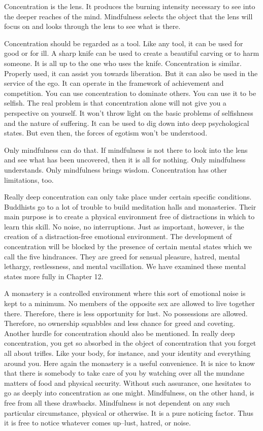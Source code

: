 Concentration is the lens. It produces the burning intensity necessary to see
into the deeper reaches of the mind. Mindfulness selects the object that the
lens will focus on and looks through the lens to see what is there.

Concentration should be regarded as a tool. Like any tool, it can be used for
good or for ill. A sharp knife can be used to create a beautiful carving or to
harm someone. It is all up to the one who uses the knife. Concentration is
similar. Properly used, it can assist you towards liberation. But it can also be
used in the service of the ego. It can operate in the framework of achievement
and competition. You can use concentration to dominate others. You can use it to
be selfish. The real problem is that concentration alone will not give you a
perspective on yourself. It won't throw light on the basic problems of
selfishness and the nature of suffering. It can be used to dig down into deep
psychological states. But even then, the forces of egotism won't be understood.

Only mindfulness can do that. If mindfulness is not there to look into the lens
and see what has been uncovered, then it is all for nothing. Only mindfulness
understands. Only mindfulness brings wisdom. Concentration has other
limitations, too.

Really deep concentration can only take place under certain specific conditions.
Buddhists go to a lot of trouble to build meditation halls and monasteries.
Their main purpose is to create a physical environment free of distractions in
which to learn this skill. No noise, no interruptions. Just as important,
however, is the creation of a distraction-free emotional environment. The
development of concentration will be blocked by the presence of certain mental
states which we call the five hindrances. They are greed for sensual pleasure,
hatred, mental lethargy, restlessness, and mental vacillation. We have examined
these mental states more fully in Chapter 12.

A monastery is a controlled environment where this sort of emotional noise is
kept to a minimum. No members of the opposite sex are allowed to live together
there. Therefore, there is less opportunity for lust. No possessions are
allowed. Therefore, no ownership squabbles and less chance for greed and
coveting. Another hurdle for concentration should also be mentioned. In really
deep concentration, you get so absorbed in the object of concentration that you
forget all about trifles. Like your body, for instance, and your identity and
everything around you. Here again the monastery is a useful convenience. It is
nice to know that there is somebody to take care of you by watching over all the
mundane matters of food and physical security. Without such assurance, one
hesitates to go as deeply into concentration as one might.  Mindfulness, on the
other hand, is free from all these drawbacks. Mindfulness is not dependent on
any such particular circumstance, physical or otherwise. It is a pure noticing
factor. Thus it is free to notice whatever comes up--lust, hatred, or noise.

